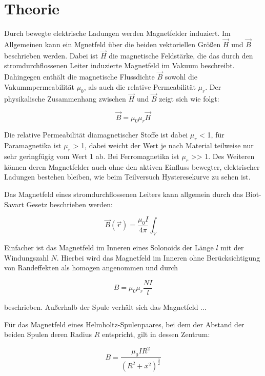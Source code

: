 \section{Theorie}
\label{sec:Theorie}

\cite{sample}


Durch bewegte elektrische Ladungen werden Magnetfelder induziert.
Im Allgemeinen kann ein Mgnetfeld über die beiden vektoriellen Größen 
$\vec H$ und $\vec B$ beschrieben werden. Dabei ist $\vec H$ die 
magnetische Feldstärke, die das durch den stromdurchflossenen Leiter induzierte 
Magnetfeld im Vakuum beschreibt. Dahingegen enthält die magnetische Flussdichte
$\vec B$ sowohl die Vakummpermeabilität $\mu_0$, als auch die relative Permeabilität
$\mu_r$. Der physikalische Zusammenhang zwischen $\vec H$ und $\vec B$ zeigt sich wie folgt:

\begin{equation}
    \vec B = \mu_0 \mu_r \vec H
\end{equation}

Die relative Permeabilität diamagnetischer Stoffe ist dabei $\mu_r$ < 1, für 
Paramagnetika ist $\mu_r$ > 1, dabei weicht der Wert je nach Material teilweise 
nur sehr geringfügig vom Wert 1 ab. Bei Ferromagnetika ist $\mu_r$ >> 1. Des Weiteren
können deren Magnetfelder auch ohne den aktiven Einfluss bewegter, elektrischer Ladungen
bestehen bleiben, wie beim Teilversuch Hysteresekurve zu sehen ist.

Das Magnetfeld eines stromdurchflossenen Leiters kann allgemein durch das Biot-Savart Gesetz
beschrieben werden:

\begin{equation}
    \vec{B}(\vec r) = \frac{\mu_0 I}{4\pi} \int_{V}  
\end{equation}

Einfacher ist das Magnetfeld im Inneren eines Solonoids der Länge $l$ 
mit der Windungszahl $N$. Hierbei wird das Magnetfeld im Inneren ohne
Berücksichtigung von Randeffekten als homogen angenommen und durch 

\begin{equation}
    B = \mu_0 \mu_r \frac{NI}l 
\end{equation}

beschrieben. Außerhalb der Spule verhält sich das Magnetfeld ...

Für das Magnetfeld eines Helmholtz-Spulenpaares, bei dem der Abstand der beiden 
Spulen deren Radius $R$ entspricht, gilt in dessen Zentrum:

\begin{equation}
    B = \frac{\mu_0 I R^2}{({R^2}+{x^2})^\frac{3}2}
\end{equation}

